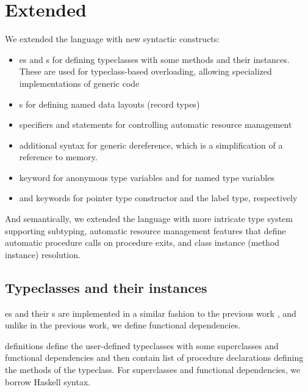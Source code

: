 \section{Extended \cmm}
\label{sec:extension}

We extended the language with new syntactic constructs:

\begin{itemize}
    \item {}es and s for defining typeclasses with some methods and their instances. These are used for typeclass-based overloading, allowing specialized implementations of generic code

    \item {}s for defining named data layouts (record types)

    \item {} specifiers and  statements for controlling automatic resource management

    \item additional \li{[ptr]} syntax for generic dereference, which is a simplification of a reference to memory.

    \item {} keyword for anonymous type variables and  for named type variables

    \item {} and  keywords for pointer type constructor and the label type, respectively
\end{itemize}

And semantically, we extended the language with more intricate type system supporting subtyping, automatic resource management features that define automatic procedure calls on procedure exits, and class instance (method instance) resolution.

\subsection{Typeclasses and their instances}

es and their s are implemented in a similar fashion to the previous work \cite{klepl2020type}, and unlike in the previous work, we define functional dependencies.

 definitions define the user-defined typeclasses with some superclasses and functional dependencies and then contain list of procedure declarations defining the methods of the typeclass. For superclasses and functional dependencies, we borrow Haskell syntax.

